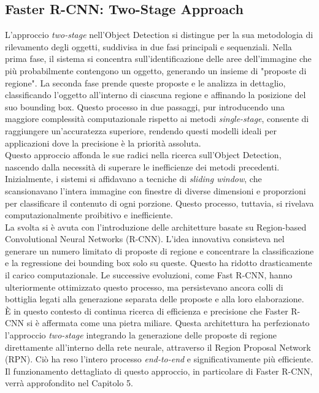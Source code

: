 \documentclass[12pt]{article}
\begin{document}
\subsection{Faster R-CNN: Two-Stage Approach}
L'approccio \textit{two-stage} nell'Object Detection si distingue per la sua metodologia di rilevamento degli oggetti, suddivisa in due fasi principali e sequenziali. Nella prima fase, il sistema si concentra sull'identificazione delle aree dell'immagine che più probabilmente contengono un oggetto, generando un insieme di "proposte di regione". La seconda fase prende queste proposte e le analizza in dettaglio, classificando l'oggetto all'interno di ciascuna regione e affinando la posizione del suo bounding box. Questo processo in due passaggi, pur introducendo una maggiore complessità computazionale rispetto ai metodi \textit{single-stage}, consente di raggiungere un'accuratezza superiore, rendendo questi modelli ideali per applicazioni dove la precisione è la priorità assoluta.\\
Questo approccio affonda le sue radici nella ricerca sull'Object Detection, nascendo dalla necessità di superare le inefficienze dei metodi precedenti. Inizialmente, i sistemi si affidavano a tecniche di \textit{sliding window}, che scansionavano l'intera immagine con finestre di diverse dimensioni e proporzioni per classificare il contenuto di ogni porzione. Questo processo, tuttavia, si rivelava computazionalmente proibitivo e inefficiente.\\
La svolta si è avuta con l'introduzione delle architetture basate su Region-based Convolutional Neural Networks (R-CNN). L'idea innovativa consisteva nel generare un numero limitato di proposte di regione e concentrare la classificazione e la regressione dei bounding box solo su queste. Questo ha ridotto drasticamente il carico computazionale. Le successive evoluzioni, come Fast R-CNN, hanno ulteriormente ottimizzato questo processo, ma persistevano ancora colli di bottiglia legati alla generazione separata delle proposte e alla loro elaborazione.\\
È in questo contesto di continua ricerca di efficienza e precisione che Faster R-CNN\cite{FasterRCNN} si è affermata come una pietra miliare. Questa architettura ha perfezionato l'approccio \textit{two-stage} integrando la generazione delle proposte di regione direttamente all'interno della rete neurale, attraverso il Region Proposal Network (RPN). Ciò ha reso l'intero processo \textit{end-to-end} e significativamente più efficiente. Il funzionamento dettagliato di questo approccio, in particolare di Faster R-CNN, verrà approfondito nel Capitolo 5. 
\end{document}
